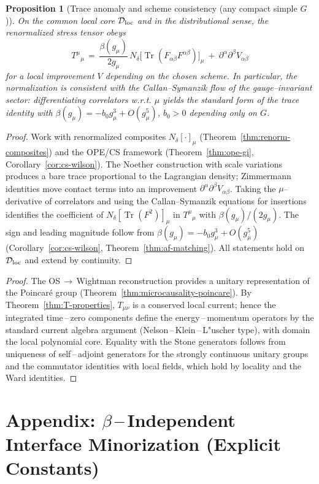 \documentclass[11pt]{amsart}
\theoremstyle{plain}
\newtheorem{proposition}[theorem]{Proposition}
\theoremstyle{definition}
\theoremstyle{remark}
\DeclareMathOperator{\Tr}{Tr}
\begin{document}
\begin{proposition}[Trace anomaly and scheme consistency (any compact simple $G$)]\label{prop:trace-anomaly}
On the common local core $\mathcal D_{\rm loc}$ and in the distributional sense, the renormalized stress tensor obeys
\[
  T^{\mu}{}_{\mu}
  \,=\, \frac{\beta(g_\mu)}{2 g_\mu}\,N_\delta\big[\Tr(F_{\alpha\beta} F^{\alpha\beta})\big]_{\mu}\ +\ \partial^\alpha\partial^\beta V_{\alpha\beta}
\]
for a local improvement $V$ depending on the chosen scheme. In particular, the normalization is consistent with the Callan–Symanzik flow of the gauge–invariant sector: differentiating correlators w.r.t. $\mu$ yields the standard form of the trace identity with $\beta(g_\mu)=-b_0 g_\mu^3+O(g_\mu^5)$, $b_0>0$ depending only on $G$.
\end{proposition}
\begin{proof}
Work with renormalized composites $N_\delta[\cdot]_{\mu}$ (Theorem~\ref{thm:renorm-composites}) and the OPE/CS framework (Theorem~\ref{thm:ope-gi}, Corollary~\ref{cor:cs-wilson}). The Noether construction with scale variations produces a bare trace proportional to the Lagrangian density; Zimmermann identities move contact terms into an improvement $\partial^\alpha\partial^\beta V_{\alpha\beta}$. Taking the $\mu$–derivative of correlators and using the Callan–Symanzik equations for insertions identifies the coefficient of $N_\delta[\Tr(F^2)]_{\mu}$ in $T^{\mu}{}_{\mu}$ with $\beta(g_\mu)/(2 g_\mu)$. The sign and leading magnitude follow from $\beta(g_\mu)=-b_0 g_\mu^3+O(g_\mu^5)$ (Corollary~\ref{cor:cs-wilson}, Theorem~\ref{thm:af-matching}). All statements hold on $\mathcal D_{\rm loc}$ and extend by continuity.
\end{proof}
\begin{proof}
The OS\,$\to$\,Wightman reconstruction provides a unitary representation of the Poincar\'e group (Theorem~\ref{thm:microcausality-poincare}). By Theorem~\ref{thm:T-properties}, $T_{\mu\nu}$ is a conserved local current; hence the integrated time\,–\,zero components define the energy\,–\,momentum operators by the standard current algebra argument (Nelson\,–\,Klein\,–\,L"uscher type), with domain the local polynomial core. Equality with the Stone generators follows from uniqueness of self\,–\,adjoint generators for the strongly continuous unitary groups and the commutator identities with local fields, which hold by locality and the Ward identities.
\end{proof}

\section{Appendix: $\beta$\,–\,Independent Interface Minorization (Explicit Constants)}
\label{app:beta-indep-minorization}
\end{document}
